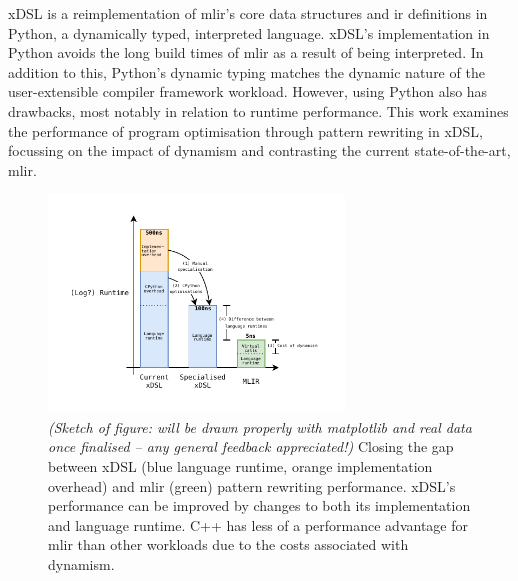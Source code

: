 
xDSL \cite{fehrXDSLSidekickCompilation2025} is a reimplementation of \ac{mlir}'s core data structures and \ac{ir} definitions in Python, a dynamically typed, interpreted language.
xDSL's implementation in Python avoids the long build times of \ac{mlir} as a result of being interpreted. %
In addition to this, Python's dynamic typing matches the dynamic nature of the user-extensible compiler framework workload.
However, using Python also has drawbacks, most notably in relation to runtime performance.
This work examines the performance of program optimisation through pattern rewriting in xDSL, focussing on the impact of dynamism and contrasting the current state-of-the-art, \ac{mlir}.







\begin{figure}
    \centering
    \includegraphics[width=0.7\textwidth]{images/11_introduction/narrative.drawio.pdf}
    \caption{\textit{(Sketch of figure: will be drawn properly with matplotlib and real data once finalised -- any general feedback appreciated!)} Closing the gap between xDSL (blue language runtime, orange implementation overhead) and \ac{mlir} (green) pattern rewriting performance. xDSL's performance can be improved by changes to both its implementation and language runtime. C++ has less of a performance advantage for \ac{mlir} than other workloads due to the costs associated with dynamism.}
    \label{fig:narrative}
\end{figure}

